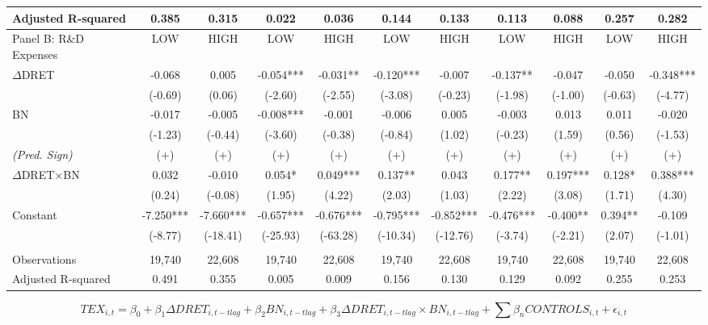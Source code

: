 \begin{table}
\begin{center}
\begin{tabular}{lcccccccccc}
			Adjusted R-squared & 0.385 & 0.315 & 0.022 & 0.036 & 0.144 & 0.133 & 0.113 & 0.088 & 0.257 & 0.282 \\
			\midrule
			Panel B: R\&D Expenses & LOW & HIGH & LOW & HIGH & LOW & HIGH & LOW & HIGH & LOW & HIGH\\
			\midrule
			$\Delta$DRET & -0.068 & 0.005 & -0.054*** & -0.031** & -0.120*** & -0.007 & -0.137** & -0.047 & -0.050 & -0.348*** \\
			& (-0.69) & (0.06) & (-2.60) & (-2.55) & (-3.08) & (-0.23) & (-1.98) & (-1.00) & (-0.63) & (-4.77) \\
			BN & -0.017 & -0.005 & -0.008*** & -0.001 & -0.006 & 0.005 & -0.003 & 0.013 & 0.011 & -0.020 \\
			& (-1.23) & (-0.44) & (-3.60) & (-0.38) & (-0.84) & (1.02) & (-0.23) & (1.59) & (0.56) & (-1.53) \\
			\rowcolor[rgb]{ .906,  .902,  .902} \textit{(Pred. Sign)} & (+) & (+) & (+) & (+) & (+) & (+) & (+) & (+) & (+) & (+) \\
			\rowcolor[rgb]{ .906,  .902,  .902} $\Delta$DRET$\times$BN & 0.032 & -0.010 & 0.054* & 0.049*** & 0.137** & 0.043 & 0.177** & 0.197*** & 0.128* & 0.388*** \\
			\rowcolor[rgb]{ .906,  .902,  .902} & (0.24) & (-0.08) & (1.95) & (4.22) & (2.03) & (1.03) & (2.22) & (3.08) & (1.71) & (4.30) \\
			Constant & -7.250*** & -7.660*** & -0.657*** & -0.676*** & -0.795*** & -0.852*** & -0.476*** & -0.400** & 0.394** & -0.109 \\
			& (-8.77) & (-18.41) & (-25.93) & (-63.28) & (-10.34) & (-12.76) & (-3.74) & (-2.21) & (2.07) & (-1.01) \\
			&   &   &   &   &   &   &   &   &   &  \\
			Observations & 19,740 & 22,608 & 19,740 & 22,608 & 19,740 & 22,608 & 19,740 & 22,608 & 19,740 & 22,608 \\
			Adjusted R-squared & 0.491 & 0.355 & 0.005 & 0.009 & 0.156 & 0.130 & 0.129 & 0.092 & 0.255 & 0.253 \\
			\bottomrule
			\bottomrule
		\end{tabular}%
	\end{center}
		\begin{footnotesize}
			\setcounter{equation}{0}
			\begin{equation}
				TEX_{i,t}=\beta_0+\beta_1\Delta DRET_{i,t-tlag}+\beta_2BN_{i,t-tlag}+\beta_3\Delta DRET_{i,t-tlag}\times 	BN_{i,t-tlag}+\sum\beta_nCONTROLS_{i,t}+\epsilon_{i,t}
			\end{equation}
			

\end{footnotesize}
\end{table}
